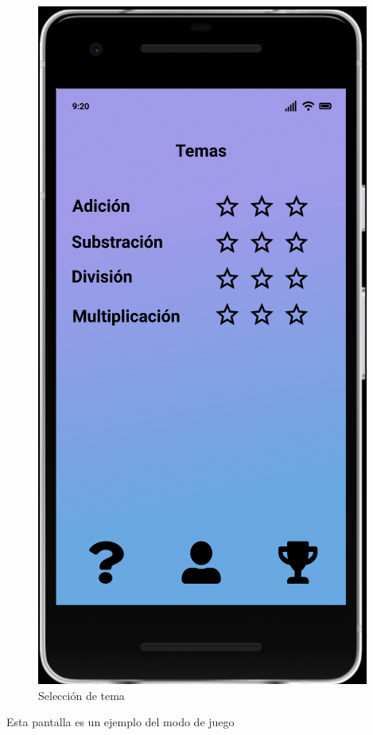 \documentclass{article}
\begin{document}
\begin{figure}[H]
    \centering
    \includegraphics[scale=0.8]{imgs/Figma/Temas}
    \caption{Selección de tema}
\end{figure}
Esta pantalla es un ejemplo del modo de juego
\end{document}
